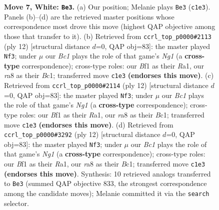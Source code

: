 \documentclass[11pt]{article}
\begin{document}
\begin{figure}[p]
\caption{\textbf{Move 7, White: \texttt{Be3}.} (a) Our position; Melanie plays \texttt{Be3} (\texttt{c1e3}). Panels (b)--(d) are the retrieved master positions whose correspondence most drove this move (highest QAP objective among those that transfer to it). (b) Retrieved from \texttt{ccrl\_top\_p0000\#2113} (ply 12) [structural distance $d$=0, QAP obj=83]: the master played \texttt{Nf3}; under $\mu$ our \emph{Bc1} plays the role of that game's \emph{Ng1} (a \textbf{cross-type} correspondence); cross-type roles: our \emph{B}f1 as their \emph{R}a1, our \emph{r}a8 as their \emph{B}c1; transferred move \texttt{c1e3} \textbf{(endorses this move)}. (c) Retrieved from \texttt{ccrl\_top\_p0000\#2114} (ply 12) [structural distance $d$=0, QAP obj=83]: the master played \texttt{Nf3}; under $\mu$ our \emph{Bc1} plays the role of that game's \emph{Ng1} (a \textbf{cross-type} correspondence); cross-type roles: our \emph{B}f1 as their \emph{R}a1, our \emph{r}a8 as their \emph{B}c1; transferred move \texttt{c1e3} \textbf{(endorses this move)}. (d) Retrieved from \texttt{ccrl\_top\_p0000\#3292} (ply 12) [structural distance $d$=0, QAP obj=83]: the master played \texttt{Nf3}; under $\mu$ our \emph{Bc1} plays the role of that game's \emph{Ng1} (a \textbf{cross-type} correspondence); cross-type roles: our \emph{B}f1 as their \emph{R}a1, our \emph{r}a8 as their \emph{B}c1; transferred move \texttt{c1e3} \textbf{(endorses this move)}. Synthesis: 10 retrieved analogs transferred to \texttt{Be3} (summed QAP objective 833, the strongest correspondence among the candidate moves); Melanie committed it via the \texttt{search} selector.}
\label{fig:thought-m12}
\end{figure}

\clearpage
\end{document}

